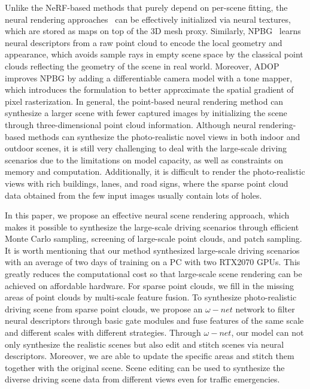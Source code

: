 \documentclass[sigconf]{acmart}
\begin{document}
 Unlike the NeRF-based methods that purely depend on per-scene fitting, the neural rendering approaches~\cite{thies2019deferred,wang2021ibutter,wu2021imitating} can be effectively initialized via neural textures, which are stored as maps on top of the 3D mesh proxy. Similarly, NPBG~\cite{aliev2020neural} learns neural descriptors from a raw point cloud to encode the local geometry and appearance, which avoids sample rays in empty scene space by the classical point clouds reflecting the geometry of the scene in real world. Moreover, ADOP~\cite{ruckert2021adop} improves NPBG by adding a differentiable camera model with a tone mapper, which introduces the formulation to better approximate the spatial gradient of pixel rasterization. In general, the point-based neural rendering method can synthesize a larger scene with fewer captured images by initializing the scene through three-dimensional point cloud information. Although neural rendering-based methods can synthesize the photo-realistic novel views in both indoor and outdoor scenes, it is still very challenging to deal with the large-scale driving scenarios due to the limitations on model capacity, as well as constraints on memory and computation. Additionally, it is difficult to render the photo-realistic views with rich buildings, lanes, and road signs, where the sparse point cloud data obtained from the few input images usually contain lots of holes.
 


In this paper, we propose an effective neural scene rendering approach, which makes it possible to synthesize the large-scale driving scenarios through efficient Monte Carlo sampling, screening of large-scale point clouds, and patch sampling. It is worth mentioning that our method synthesized large-scale driving scenarios with an average of two days of training on a PC with two RTX2070 GPUs. This greatly reduces the computational cost so that large-scale scene rendering can be achieved on affordable hardware. For sparse point clouds, we fill in the missing areas of point clouds by multi-scale feature fusion. To synthesize photo-realistic driving scene from sparse point clouds, we propose an $\omega-net$ network to filter neural descriptors through basic gate modules and fuse features of the same scale and different scales with different strategies. Through $\omega-net$, our model can not only synthesize the realistic scenes but also edit and stitch scenes via neural descriptors. Moreover, we are able to update the specific areas and stitch them together with the original scene. Scene editing can be used to synthesize the diverse driving scene data from different views even for traffic emergencies.
\end{document}
